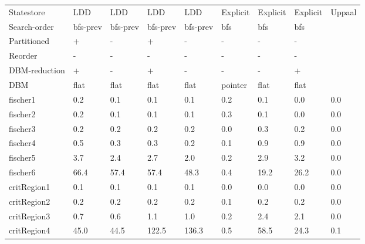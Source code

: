 \begin{table}
\label{fig:time_3}
\begin{adjustbox}{max totalheight=\textheight}
    \begin{tabular}{|l|llllllll|}
    \hline
     Statestore        & LDD      & LDD      & LDD      & LDD      & Explicit & Explicit & Explicit & Uppaal \\
    Search-order       & bfs-prev & bfs-prev & bfs-prev & bfs-prev & bfs      & bfs      & bfs      & ~      \\
    Partitioned        & +        & -        & +        & -        & -        & -        & -        & ~      \\
    Reorder            & -        & -        & -        & -        & -        & -        & -        & ~      \\
    DBM-reduction      & +        & -        & +        & -        & -        & -        & +        & ~      \\
    DBM                & flat     & flat     & flat     & flat     & pointer  & flat     & flat     & ~      \\ \hline
    fischer1           & 0.2      & 0.1      & 0.1      & 0.1      & 0.2      & 0.1      & 0.0      & 0.0    \\
    fischer2           & 0.2      & 0.1      & 0.1      & 0.1      & 0.3      & 0.1      & 0.0      & 0.0    \\
    fischer3           & 0.2      & 0.2      & 0.2      & 0.2      & 0.0      & 0.3      & 0.2      & 0.0    \\
    fischer4           & 0.5      & 0.3      & 0.3      & 0.2      & 0.1      & 0.9      & 0.9      & 0.0    \\
    fischer5           & 3.7      & 2.4      & 2.7      & 2.0      & 0.2      & 2.9      & 3.2      & 0.0    \\
    fischer6           & 66.4     & 57.4     & 57.4     & 48.3     & 0.4      & 19.2     & 26.2     & 0.0    \\ \hline
    critRegion1        & 0.1      & 0.1      & 0.1      & 0.1      & 0.0      & 0.0      & 0.0      & 0.0    \\
    critRegion2        & 0.2      & 0.2      & 0.2      & 0.2      & 0.1      & 0.2      & 0.2      & 0.0    \\
    critRegion3        & 0.7      & 0.6      & 1.1      & 1.0      & 0.2      & 2.4      & 2.1      & 0.0    \\
    critRegion4        & 45.0     & 44.5     & 122.5    & 136.3    & 0.5      & 58.5     & 24.3     & 0.1    \\ \hline

\end{tabular}
\end{adjustbox}
\end{table}
